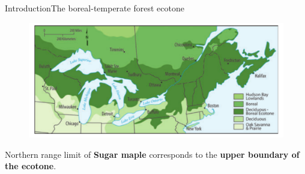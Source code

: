 \documentclass[table]{eecslides}
\begin{document}

\begin{frame}{Introduction}{The boreal-temperate forest ecotone}
	\begin{figure}
		\includegraphics[width=.6\paperwidth]{Figs/ecotone.pdf}
		\caption*{\scriptsize{\cite{Goldblum2010}}}
	\end{figure}

\begin{center}
	Northern range limit of \textbf{Sugar maple} corresponds to the \textbf{upper boundary of the ecotone}.\\
\end{center}


\end{frame}


\end{document}
